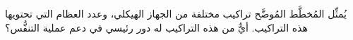 
\begin{question}

\begin{instance}

\begin{mcq}[standalone=false]

\begin{stem}
يُمثِّل المُخطَّط المُوضَّح تراكيب مختلفة من الجهاز الهيكلي، وعدد العظام التي تحتويها هذه التراكيب. أيٌّ من هذه التراكيب له دور رئيسي في دعم عملية التنفُّس؟\par
{}
\end{stem}

\begin{distractors}
        
\end{distractors}

\end{mcq}

\end{instance}

\end{question}
